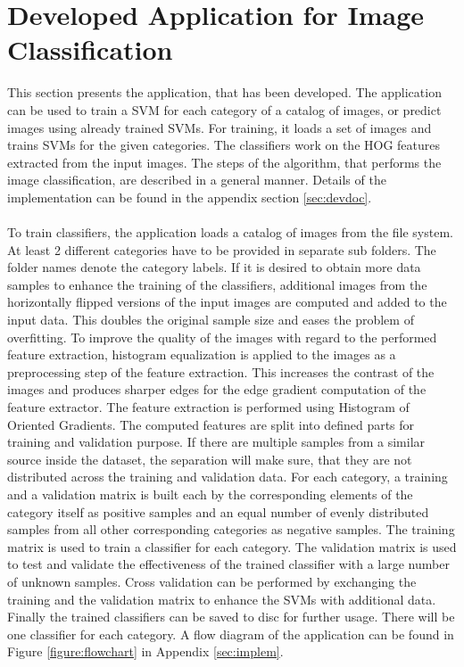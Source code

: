 
\section{Developed Application for Image Classification}\label{sec:application}

This section presents the application, that has been developed. The application can be used to train a SVM for each category of a catalog of images, or predict images using already trained SVMs. For training, it loads a set of images and trains SVMs for the given categories. The classifiers work on the HOG features extracted from the input images. The steps of the algorithm, that performs the image classification, are described in a general manner. Details of the implementation can be found in the appendix section \ref{sec:devdoc}.
\\
\\
To train classifiers, the application loads a catalog of images from the file system. At least 2 different categories have to be provided in separate sub folders. The folder names denote the category labels. If it is desired to obtain more data samples to enhance the training of the classifiers, additional images from the horizontally flipped versions of the input images are computed and added to the input data. This doubles the original sample size and eases the problem of overfitting. To improve the quality of the images with regard to the performed feature extraction, histogram equalization is applied to the images as a preprocessing step of the feature extraction. This increases the contrast of the images and produces sharper edges for the edge gradient computation of the feature extractor. The feature extraction is performed using Histogram of Oriented Gradients. The computed features are split into defined parts for training and validation purpose. If there are multiple samples from a similar source inside the dataset, the separation will make sure, that they are not distributed across the training and validation data. For each category, a training and a validation matrix is built each by the corresponding elements of the category itself as positive samples and an equal number of evenly distributed samples from all other corresponding categories as negative samples. The training matrix is used to train a classifier for each category. The validation matrix is used to test and validate the effectiveness of the trained classifier with a large number of unknown samples. Cross validation can be performed by exchanging the training and the validation matrix to enhance the SVMs with additional data. Finally the trained classifiers can be saved to disc for further usage. There will be one classifier for each category. A flow diagram of the application can be found in Figure \ref{figure:flowchart} in Appendix \ref{sec:implem}.
